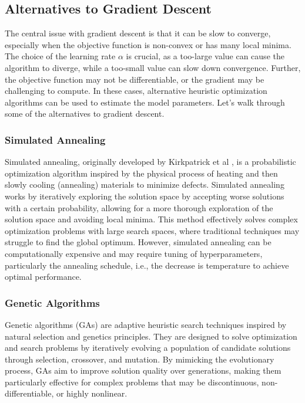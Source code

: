 \documentclass{article}[12pt]
\begin{document}
\subsection{Alternatives to Gradient Descent}
The central issue with gradient descent is that it can be slow to converge, especially when the objective function is non-convex or has many local minima.
The choice of the learning rate $\alpha$ is crucial, as a too-large value can cause the algorithm to diverge, while a too-small value can slow down convergence.
Further, the objective function may not be differentiable, or the gradient may be challenging to compute.
In these cases, alternative heuristic optimization algorithms can be used to estimate the model parameters.
Let's walk through some of the alternatives to gradient descent.

\subsubsection*{Simulated Annealing}
Simulated annealing, originally developed by Kirkpatrick et al \cite{Kirkpatrick:1983aa}, is a probabilistic optimization algorithm inspired by the physical process of 
heating and then slowly cooling (annealing) materials to minimize defects.
Simulated annealing works by iteratively exploring the solution space by accepting worse solutions with a certain probability, allowing for a more thorough exploration of the solution space and avoiding local minima.
This method effectively solves complex optimization problems with large search spaces, where traditional techniques may struggle to find the global optimum.
However, simulated annealing can be computationally expensive and may require tuning of hyperparameters, particularly the annealing schedule, i.e., the decrease is temperature to achieve optimal performance.

\subsubsection*{Genetic Algorithms}
Genetic algorithms (GAs) are adaptive heuristic search techniques inspired by natural selection and genetics principles. They are designed to solve optimization and search problems by iteratively evolving a population of candidate solutions through selection, crossover, and mutation. By mimicking the evolutionary process, GAs aim to improve solution quality over generations, making them particularly effective for complex problems that may be discontinuous, non-differentiable, or highly nonlinear.
\end{document}

